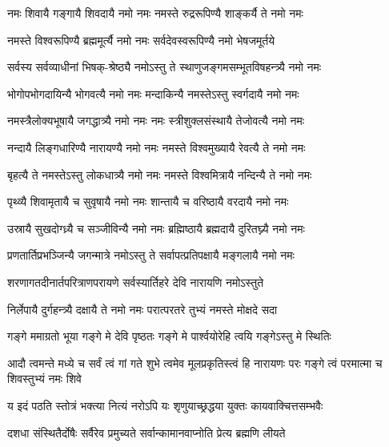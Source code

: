 


\twolineshloka
{नमः शिवायै गङ्गायै शिवदायै नमो नमः}
{नमस्ते रुद्ररूपिण्यै शाङ्कर्यै ते नमो नमः}%

\twolineshloka
{नमस्ते विश्वरूपिण्यै ब्रह्ममूर्त्यै नमो नमः}
{सर्वदेवस्वरूपिण्यै नमो भेषजमूर्तये}%

\twolineshloka
{सर्वस्य सर्वव्याधीनां भिषक्-श्रेष्ठ्यै नमोऽस्तु ते}
{स्थाणुजङ्गमसम्भूतविषहन्त्र्यै नमो नमः}%

\twolineshloka
{भोगोपभोगदायिन्यै भोगवत्यै नमो नमः}
{मन्दाकिन्यै नमस्तेऽस्तु स्वर्गदायै नमो नमः}%

\twolineshloka
{नमस्त्रैलोक्यभूषायै जगद्धात्र्यै नमो नमः}
{नमः स्त्रीशुक्लसंस्थायै तेजोवत्यै नमो नमः}%

\twolineshloka
{नन्दायै लिङ्गधारिण्यै नारायण्यै नमो नमः}
{नमस्ते विश्वमुख्यायै रेवत्यै ते नमो नमः}%

\twolineshloka
{बृहत्यै ते नमस्तेऽस्तु लोकधात्र्यै नमो नमः}
{नमस्ते विश्वमित्रायै नन्दिन्यै ते नमो नमः}%

\twolineshloka
{पृथ्व्यै शिवामृतायै च सुवृषायै नमो नमः}
{शान्तायै च वरिष्ठायै वरदायै नमो नमः}%

\twolineshloka
{उस्रायै सुखदोग्ध्र्यै च सञ्जीविन्यै नमो नमः}
{ब्रह्मिष्ठायै ब्रह्मदायै दुरितघ्न्यै नमो नमः}

\twolineshloka
{प्रणतार्तिप्रभञ्जिन्यै जगन्मात्रे नमोऽस्तु ते}%
{सर्वापत्प्रतिपक्षायै मङ्गलायै नमो नमः}%

\twolineshloka
{शरणागतदीनार्तपरित्राणपरायणे}
{सर्वस्यार्तिहरे देवि नारायणि नमोऽस्तुते}%

\twolineshloka
{निर्लेपायै दुर्गहन्त्र्यै दक्षायै ते नमो नमः}
{परात्परतरे तुभ्यं नमस्ते मोक्षदे सदा}%

\twolineshloka
{गङ्गे ममाग्रतो भूया गङ्गे मे देवि पृष्ठतः}
{गङ्गे मे पार्श्वयोरेहि त्वयि गङ्गेऽस्तु मे स्थितिः}%

\threelineshloka
{आदौ त्वमन्ते मध्ये च सर्वं त्वं गां गते शुभे}
{त्वमेव मूलप्रकृतिस्त्वं हि नारायणः परः}%
{गङ्गे त्वं परमात्मा च शिवस्तुभ्यं नमः शिवे}

\twolineshloka
{य इदं पठति स्तोत्रं भक्त्या नित्यं नरोऽपि यः}%
{शृणुयाच्छ्रद्धया युक्तः कायवाक्चित्तसम्भवैः}

\twolineshloka
{दशधा  संस्थितैर्दोषैः सर्वैरेव प्रमुच्यते}%
{सर्वान्कामानवाप्नोति प्रेत्य ब्रह्मणि लीयते}

